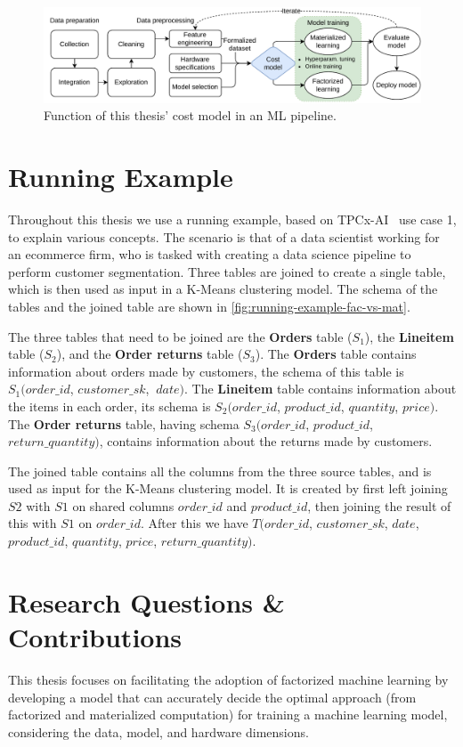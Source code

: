 \begin{figure}[ht]
  \centering
  \includegraphics[width=0.95\linewidth]{chapters/01_introduction/figures/ML-Pipeline.pdf}
  \caption{Function of this thesis' cost model in an ML pipeline.}
  \label{fig:ml-pipeline}
\end{figure}

\section{Running Example}
Throughout this thesis we use a running example, based on TPCx-AI~\cite{tpcx-ai} use case 1, to explain various concepts. The scenario is that of a data scientist working for an ecommerce firm, who is tasked with creating a data science pipeline to perform customer segmentation. Three tables are joined to create a single table, which is then used as input in a K-Means clustering model. The schema of the tables and the joined table are shown in \autoref{fig:running-example-fac-vs-mat}.

The three tables that need to be joined are the \textbf{Orders} table ($S_1$), the \textbf{Lineitem} table ($S_2$), and the \textbf{Order returns} table ($S_3$). The \textbf{Orders} table contains information about orders made by customers, the schema of this table is $S_1(order\_id$, $customer\_sk$, $\ date)$. The \textbf{Lineitem} table contains information about the items in each order, its schema is $S_2(order\_id$, $product\_id$, $quantity$,  $price)$. The \textbf{Order returns} table, having schema $S_3(order\_id$, $product\_id$, $return\_quantity)$, contains information about the returns made by customers.

The joined table contains all the columns from the three source tables, and is used as input for the K-Means clustering model. It is created by first left joining $S2$ with $S1$ on shared columns $order\_id$ and $product\_id$, then joining the result of this with $S1$ on $order\_id$. After this we have $T(order\_id$, $customer\_sk$, $date$, $product\_id$, $quantity$, $price$, $return\_quantity)$.

\section{Research Questions \& Contributions}
This thesis focuses on facilitating the adoption of factorized machine learning by developing a model that can accurately decide the optimal approach (from factorized and materialized computation) for training a machine learning model, considering the data, model, and hardware dimensions.

